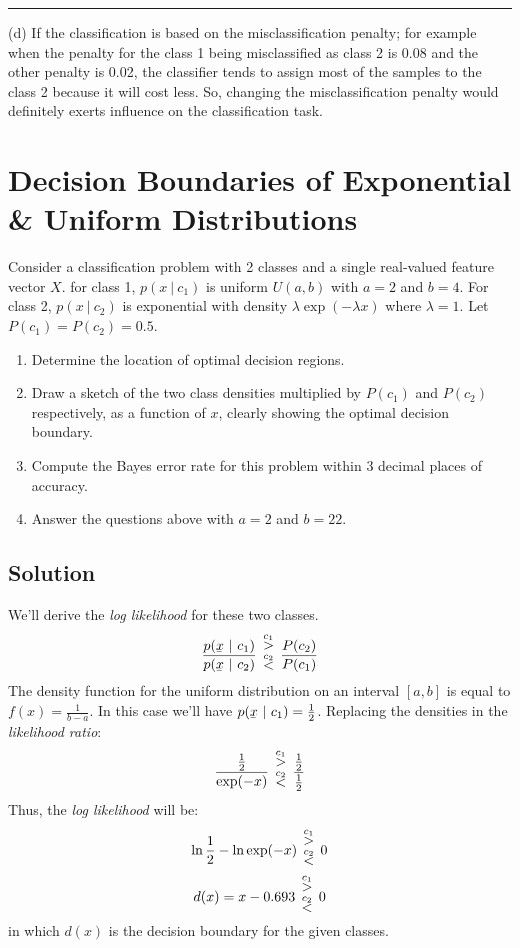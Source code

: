 \documentclass[12pt]{article}
\numberwithin{equation}{section}
\numberwithin{table}{section}
\numberwithin{figure}{section}
\newcommand*{\bfrac}[2]{\genfrac{}{}{0pt}{}{#1}{#2}}
\begin{document}
\noindent\rule{\textwidth}{.5pt}
(d) If the classification is based on the misclassification penalty; for example when the penalty for the class 1 being misclassified as class 2 is 0.08 and the other penalty is 0.02, the classifier tends to assign most of the samples to the class 2 because it will cost less. So, changing the misclassification penalty would definitely exerts influence on the classification task.

\section{Decision Boundaries of Exponential \& Uniform Distributions}
Consider a classification problem with 2 classes and a single real-valued feature vector $X$. for class 1, $p(x\ |\ c_1)$ is uniform $U(a, b)$ with $a=2$ and $b=4$. For class 2, $p(x\ |\ c_2)$ is exponential with density $\lambda \exp(-\lambda x)$ where $\lambda=1$. Let $P(c_1)=P(c_2)=0.5$.

\begin{enumerate}[label=(\alph*)]
	\item Determine the location of optimal decision regions.
	
	\item Draw a sketch of the two class densities multiplied by $P(c_1)$ and $P(c_2)$ respectively, as a function of $x$, clearly showing the optimal decision boundary.
	
	\item Compute the Bayes error rate for this problem within 3 decimal places of accuracy.
	
	\item Answer the questions above with $a=2$ and $b=22$.
\end{enumerate}
\subsection*{Solution}
We'll derive the \textit{log likelihood} for these two classes.
$$
	\frac{p(\underaccent{\bar}{x}\ |\ c_1)}{p(\underaccent{\bar}{x}\ |\ c_2)}\  \bfrac{\overset{c_1}{>}}{\overset{c_2}{<}}\ \frac{P(c_2)}{P(c_1)}
$$
The density function for the uniform distribution on an interval $[a, b]$ is equal to $f(x) = \frac{1}{b-a}$. In this case we'll have $p(\underaccent{\bar}{x}\ |\ c_1) = \frac{1}{2}$. Replacing the densities in the \textit{likelihood ratio}:
$$
	\frac{\frac{1}{2}}{\exp(-x)}\  		\bfrac{\overset{c_1}{>}}{\overset{c_2}{<}}\ \frac{\frac{1}{2}}{\frac{1}{2}}
$$	
Thus, the \textit{log likelihood} will be:
$$
	\ln \frac{1}{2} - \ln \exp(-x) \		\bfrac{\overset{c_1}{>}}{\overset{c_2}{<}}\ 0
$$	
$$
	d(x) = x - 0.693\ 		\bfrac{\overset{c_1}{>}}{\overset{c_2}{<}}\ 0
$$	
in which $d(x)$ is the decision boundary for the given classes.
\newpage
\end{document}
